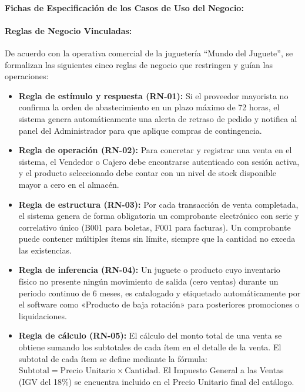 \documentclass[12pt,a4paper]{article}
\begin{document}
\paragraph{Fichas de Especificación de los Casos de Uso del Negocio:}



\paragraph{Reglas de Negocio Vinculadas:}

De acuerdo con la operativa comercial de la juguetería ``Mundo del Juguete'', se formalizan las siguientes cinco reglas de negocio que restringen y guían las operaciones:

\begin{itemize}
  \item \textbf{Regla de estímulo y respuesta (RN-01):} Si el proveedor mayorista no confirma la orden de abastecimiento en un plazo máximo de 72 horas, el sistema genera automáticamente una alerta de retraso de pedido y notifica al panel del Administrador para que aplique compras de contingencia.
  \item \textbf{Regla de operación (RN-02):} Para concretar y registrar una venta en el sistema, el Vendedor o Cajero debe encontrarse autenticado con sesión activa, y el producto seleccionado debe contar con un nivel de stock disponible mayor a cero en el almacén.
  \item \textbf{Regla de estructura (RN-03):} Por cada transacción de venta completada, el sistema genera de forma obligatoria un comprobante electrónico con serie y correlativo único (B001 para boletas, F001 para facturas). Un comprobante puede contener múltiples ítems sin límite, siempre que la cantidad no exceda las existencias.
  \item \textbf{Regla de inferencia (RN-04):} Un juguete o producto cuyo inventario físico no presente ningún movimiento de salida (cero ventas) durante un periodo continuo de 6 meses, es catalogado y etiquetado automáticamente por el software como «Producto de baja rotación» para posteriores promociones o liquidaciones.
  \item \textbf{Regla de cálculo (RN-05):} El cálculo del monto total de una venta se obtiene sumando los subtotales de cada ítem en el detalle de la venta. El subtotal de cada ítem se define mediante la fórmula: $\text{Subtotal} = \text{Precio Unitario} \times \text{Cantidad}$. El Impuesto General a las Ventas (IGV del 18\%) se encuentra incluido en el Precio Unitario final del catálogo.
\end{itemize}
\end{document}
